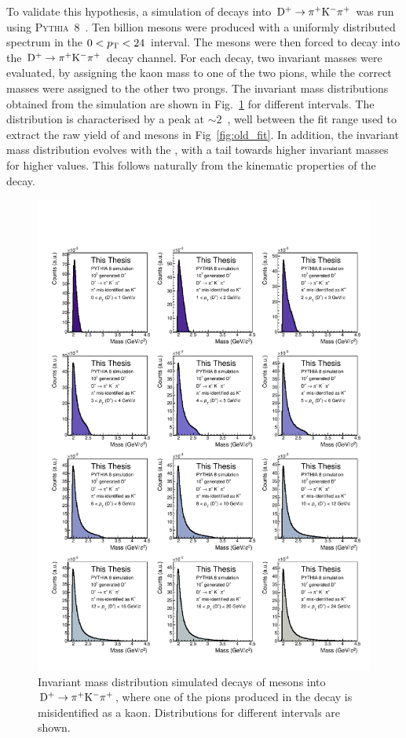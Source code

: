 To validate this hypothesis, a simulation of \dpl decays into $\mathrm{D^+}\rightarrow\mathrm{\pi^+K^-\pi^+}$ was run using \textsc{Pythia}~8~\cite{Bierlich:2022pfr}. Ten billion \dpl mesons were produced with a uniformly distributed \pt spectrum in the $0<p_\mathrm{T}<24$~\gevc interval. The \dpl mesons were then forced to decay into the $\mathrm{D^+}\rightarrow\mathrm{\pi^+K^-\pi^+}$ decay channel. For each decay, two invariant masses were evaluated, by assigning the kaon mass to one of the two pions, while the correct masses were assigned to the other two prongs. The invariant mass distributions obtained from the simulation are shown in Fig.~\ref{fig:DplusSimulations} for different \pt intervals. The distribution is characterised by a peak at $\sim 2$~\gevcc, well between the fit range used to extract the raw yield of \ds and \dpl mesons in Fig~\ref{fig:old_fit}. In addition, the invariant mass distribution evolves with the \dpl \pt, with a tail towards higher invariant masses for higher \pt values. This follows naturally from the kinematic properties of the decay.

\begin{figure}[htbp]
    \centering
    \includegraphics[width=\textwidth]{Figures/Chapter 5/Dplus_Corr_Bkg_simulation.pdf}
    \caption{Invariant mass distribution simulated decays of \dpl mesons into \mbox{$\mathrm{D^+}\rightarrow\mathrm{\pi^+K^-\pi^+}$}, where one of the pions produced in the decay is misidentified as a kaon. Distributions for different \pt intervals are shown. }
    \label{fig:DplusSimulations}
\end{figure}

